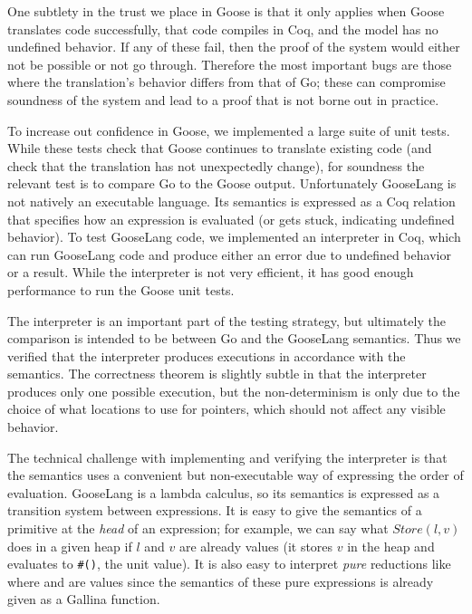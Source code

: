 One subtlety in the trust we place in Goose is that it only applies when
Goose translates code successfully, that code compiles in Coq, and the
model has no undefined behavior. If any of these fail, then the proof of
the system would either not be possible or not go through. Therefore the
most important bugs are those where the translation's behavior differs
from that of Go; these can compromise soundness of the system and lead
to a proof that is not borne out in practice.

To increase out confidence in Goose, we implemented a large suite of
unit tests. While these tests check that Goose continues to translate
existing code (and check that the translation has not unexpectedly
change), for soundness the relevant test is to compare Go to the Goose
output. Unfortunately GooseLang is not natively an executable language.
Its semantics is expressed as a Coq relation that specifies how an
expression is evaluated (or gets stuck, indicating undefined behavior).
To test GooseLang code, we implemented an interpreter in Coq, which can
run GooseLang code and produce either an error due to undefined behavior
or a result. While the interpreter is not very efficient, it has good
enough performance to run the Goose unit tests.

The interpreter is an important part of the testing strategy, but
ultimately the comparison is intended to be between Go and the GooseLang
semantics. Thus we verified that the interpreter produces executions in
accordance with the semantics. The correctness theorem is slightly
subtle in that the interpreter produces only one possible execution, but
the non-determinism is only due to the choice of what locations to use
for pointers, which should not affect any visible behavior.

The technical challenge with implementing and verifying the interpreter
is that the semantics uses a convenient but non-executable way of
expressing the order of evaluation. GooseLang is a lambda calculus, so
its semantics is expressed as a transition system between expressions.
It is easy to give the semantics of a primitive at the \emph{head} of an
expression; for example, we can say what $Store(l, v)$ does in a given
heap if $l$ and $v$ are already values (it stores $v$ in the heap
and evaluates to \texttt{\#()}, the unit value). It is also easy to
interpret \emph{pure} reductions like  where 
and  are values since the semantics of these pure expressions
is already given as a Gallina function.

